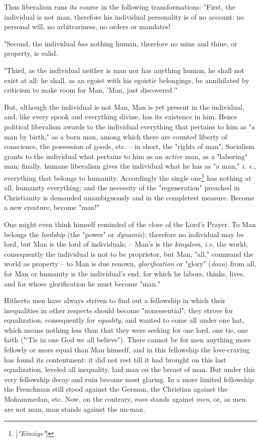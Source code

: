Thus liberalism runs its course in the following transformations: "{}First, 
the individual is not man, therefore his individual personality is of no 
account: no personal will, no arbitrariness, no orders or mandates!

"{}Second, the individual \textit{has} nothing human, therefore no mine and 
thine, or property, is valid.

"{}Third, as the individual neither is man nor has anything human, he shall 
not exist at all: he shall, as an egoist with his egoistic belongings, be 
annihilated by criticism to make room for Man, 'Man, just discovered.'"{}

But, although the individual is not Man, Man is yet present in the individual, 
and, like every spook and everything divine, has its existence in him. Hence 
political liberalism awards to the individual everything that pertains to him 
as "{}a man by birth,"{} as a born man, among which there are counted liberty 
of conscience, the possession of goods, etc. -- in short, the "{}rights of 
man"{}; Socialism grants to the individual what pertains to him as an 
\textit{active} man, as a "{}laboring"{} man; finally. humane liberalism gives 
the individual what he has as "{}a man,"{} \textit{i. e.}, everything that 
belongs to humanity. Accordingly the single 
one\footnote{[\textit{"{}Einzige"{}}]} has nothing at all, humanity 
everything; and the necessity of the "{}regeneration"{} preached in 
Christianity is demanded unambiguously and in the completest measure. Become a 
new creature, become "{}man!"{}

One might even think himself reminded of the close of the Lord's Prayer. To 
Man belongs the \textit{lordship} (the "{}power"{} or \textit{dynamis}); 
therefore no individual may be lord, but Man is the lord of individuals; -- 
Man's is the \textit{kingdom}, \textit{i.e.} the world, consequently the 
individual is not to be proprietor, but Man, "{}all,"{} command the world as 
property -- to Man is due renown, \textit{glorification} or "{}glory"{} 
(\textit{doxa}) from all, for Man or humanity is the individual's end, for 
which he labors, thinks, lives, and for whose glorification he must become 
"{}man."{}

Hitherto men have always striven to find out a fellowship in which their 
inequalities in other respects should become "{}nonessential"{}; they strove 
for equalization, consequently for \textit{equality}, and wanted to come all 
under one hat, which means nothing less than that they were seeking for one 
lord, one tie, one faith ("{}`Tis in one God we all believe"{}). There cannot 
be for men anything more fellowly or more equal than Man himself, and in this 
fellowship the love-craving has found its contentment: it did not rest till it 
had brought on this last equalization, leveled all inequality, laid man on the 
breast of man. But under this very fellowship decay and ruin become most 
glaring. In a more limited fellowship the Frenchman still stood against the 
German, the Christian against the Mohammedan, etc. Now, on the contrary, 
\textit{man} stands against \textit{men}, or, as men are not man, man stands 
against the un-man.

